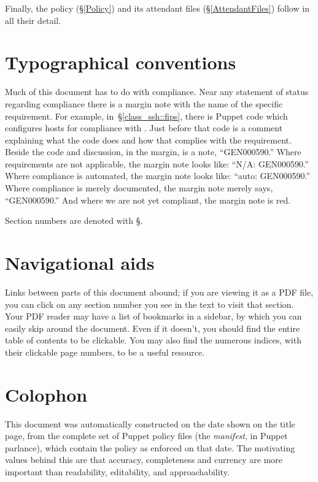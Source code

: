 Finally, the policy (\S\ref{Policy}) and its attendant files
(\S\ref{AttendantFiles}) follow in all their detail.


\section{Typographical conventions}

Much of this document has to do with compliance. Near any statement of
status regarding compliance there is a margin note with the name of the
specific requirement. For example, in~\S\ref{class_ssh::fips}, there is
Puppet code which configures hosts for compliance with
. Just before that code is a comment explaining what
the code does and how that complies with the requirement. Beside the code
and discussion, in the margin, is a note, ``GEN000590.'' Where
requirements are not applicable, the margin note looks like: ``N/A:
GEN000590.'' Where compliance is automated, the margin note looks like:
``auto: GEN000590.'' Where compliance is merely documented, the margin
note merely says, ``GEN000590.'' And where we are not yet compliant, the
margin note is red.

Section numbers are denoted with \S.


\section{Navigational aids}

Links between parts of this document abound; if you are viewing it as a
PDF file, you can click on any section number you see in the text to visit
that section. Your PDF reader may have a list of bookmarks in a sidebar,
by which you can easily skip around the document.  Even if it doesn't, you
should find the entire table of contents to be clickable. You may also
find the numerous indices, with their clickable page numbers, to be a
useful resource.


\section{Colophon}
\label{Colophon}

This document was automatically constructed on the date shown on the title
page, from the complete set of Puppet policy files (the \emph{manifest},
in Puppet parlance), which contain the policy as enforced on that date.
The motivating values behind this are that accuracy, completeness and
currency are more important than readability, editability, and
approachability.

